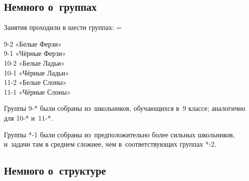 


\begingroup
\providecommand\ifsourcelinks{\iffalse}
\providecommand\url{\texttt}

\strut

\vfill

\begin{center}
\end{center}

\vfill

\strut

\clearpage


\subsection*{Немного о~группах}

Занятия проходили в шести группах:
\begingroup\multicolsep=\parskip
\begin{multicols}{3}
9-2  «Белые Ферзи»
\\
9-1  «Чёрные Ферзи»
\\
10-2 «Белые Ладьи»
\\
10-1 «Чёрные Ладьи»
\\
11-2 «Белые Слоны»
\\
11-1 «Чёрные Слоны»
\end{multicols}
\endgroup

Группы \mbox{9-*} были собраны из~школьников, обучающихся в~9 классе;
аналогично для \mbox{10-*} и~\mbox{11-*}.

Группы \mbox{*-1} были собраны из~предположительно более сильных школьников,
и~задачи там в среднем сложнее, чем в~соответствующих группах \mbox{*-2}.


\subsection*{Немного о~структуре}

